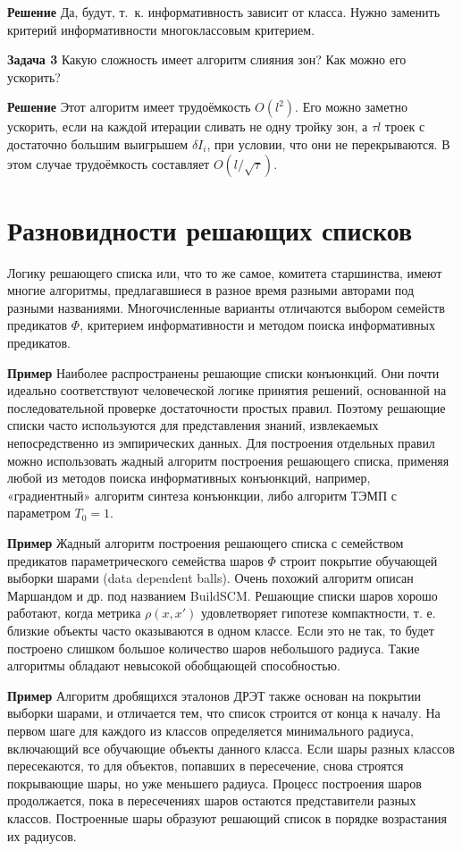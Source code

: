 \textbf{Решение}
Да, будут, т.~к. информативность зависит от класса. Нужно заменить критерий информативности многоклассовым критерием.

\textbf{Задача 3}
Какую сложность имеет алгоритм слияния зон? Как можно его ускорить?

\textbf{Решение}
Этот алгоритм имеет трудоёмкость $O(l^2)$. Его можно заметно ускорить, если на каждой итерации сливать не одну тройку зон, а $\tau l$ троек с достаточно большим выигрышем $\delta I_i$, при условии, что они не перекрываются. В этом случае трудоёмкость составляет $O(l / \sqrt{\tau})$.






\section{Разновидности решающих списков}

Логику решающего списка или, что то же самое, комитета старшинства, имеют многие алгоритмы, предлагавшиеся в разное время разными авторами под разными названиями. Многочисленные варианты отличаются выбором семейств предикатов $\Phi$, критерием информативности и методом поиска информативных предикатов.

\textbf{Пример} Наиболее распространены решающие списки конъюнкций. Они почти идеально соответствуют человеческой логике принятия решений, основанной на последовательной проверке достаточности простых правил. Поэтому решающие списки часто используются для представления знаний, извлекаемых непосредственно из эмпирических данных. Для построения отдельных правил можно использовать жадный алгоритм построения решающего списка, применяя любой из методов поиска информативных конъюнкций, например, «градиентный» алгоритм синтеза конъюнкции, либо алгоритм ТЭМП с параметром $T_0 = 1$.

\textbf{Пример} Жадный алгоритм построения решающего списка с семейством предикатов параметрического семейства шаров $\Phi$ строит покрытие обучающей выборки шарами (data dependent balls). Очень похожий алгоритм описан Маршандом и др. под названием BuildSCM. Решающие списки шаров хорошо работают, когда метрика $\rho(x, x')$ удовлетворяет гипотезе компактности, т. е. близкие объекты часто оказываются в одном классе. Если это не так, то будет построено слишком большое количество шаров небольшого радиуса. Такие алгоритмы обладают невысокой обобщающей способностью.

\textbf{Пример} Алгоритм дробящихся эталонов ДРЭТ также основан на покрытии выборки шарами, и отличается тем, что список строится от конца к началу. На первом шаге для каждого из классов определяется минимального радиуса, включающий все обучающие объекты данного класса. Если шары разных классов
пересекаются, то для объектов, попавших в пересечение, снова строятся покрывающие шары, но уже меньшего радиуса. Процесс построения шаров продолжается, пока в пересечениях шаров остаются представители разных классов. Построенные шары образуют решающий список в порядке возрастания их радиусов.

